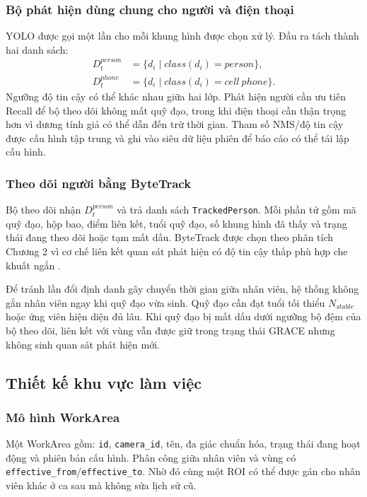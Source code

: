 \subsubsection{Bộ phát hiện dùng chung cho người và điện thoại}
YOLO được gọi một lần cho mỗi khung hình được chọn xử lý. Đầu ra tách thành hai danh sách:
\begin{align}
 D^{person}_t &= \{d_i\mid class(d_i)=person\},\\
 D^{phone}_t &= \{d_i\mid class(d_i)=cell\ phone\}.
\end{align}
Ngưỡng độ tin cậy có thể khác nhau giữa hai lớp. Phát hiện người cần ưu tiên Recall để bộ theo dõi không mất quỹ đạo, trong khi điện thoại cần thận trọng hơn vì dương tính giả có thể dẫn đến trừ thời gian. Tham số NMS/độ tin cậy được cấu hình tập trung và ghi vào siêu dữ liệu phiên để báo cáo có thể tái lập cấu hình.

\subsubsection{Theo dõi người bằng ByteTrack}
Bộ theo dõi nhận $D^{person}_t$ và trả danh sách \texttt{TrackedPerson}. Mỗi phần tử gồm mã quỹ đạo, hộp bao, điểm liên kết, tuổi quỹ đạo, số khung hình đã thấy và trạng thái đang theo dõi hoặc tạm mất dấu. ByteTrack được chọn theo phân tích Chương 2 vì cơ chế liên kết quan sát phát hiện có độ tin cậy thấp phù hợp che khuất ngắn \cite{bytetrack}.

Để tránh lần đổi định danh gây chuyển thời gian giữa nhân viên, hệ thống không gắn nhân viên ngay khi quỹ đạo vừa sinh. Quỹ đạo cần đạt tuổi tối thiểu $N_{stable}$ hoặc ứng viên hiện diện đủ lâu. Khi quỹ đạo bị mất dấu dưới ngưỡng bộ đệm của bộ theo dõi, liên kết với vùng vẫn được giữ trong trạng thái GRACE nhưng không sinh quan sát phát hiện mới.

\subsection{Thiết kế khu vực làm việc}
\subsubsection{Mô hình WorkArea}
Một WorkArea gồm: \texttt{id}, \texttt{camera\_id}, tên, đa giác chuẩn hóa, trạng thái đang hoạt động và phiên bản cấu hình. Phân công giữa nhân viên và vùng có \texttt{effective\_from}/\texttt{effective\_to}. Nhờ đó cùng một ROI có thể được gán cho nhân viên khác ở ca sau mà không sửa lịch sử cũ.

